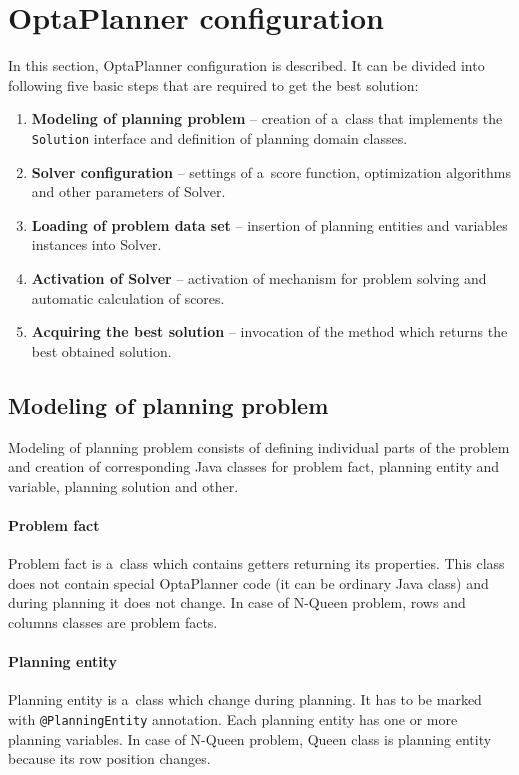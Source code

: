 \section{OptaPlanner configuration}\label{PlannerConfSection}
In this section, OptaPlanner configuration is described. It can be divided into following five basic steps that are
required to get the best solution:

\begin{enumerate}
    \item \textbf{Modeling of planning problem} -- creation of a~class that implements the \texttt{Solution} interface
    and definition of planning domain classes.
    \item \textbf{Solver configuration} -- settings of a~score function, optimization algorithms and other parameters of
    Solver.
    \item \textbf{Loading of problem data set} -- insertion of planning entities and variables instances into Solver.
    \item \textbf{Activation of Solver} -- activation of mechanism for problem solving and automatic calculation of
    scores.
    \item \textbf{Acquiring the best solution} -- invocation of the method which returns the best obtained solution.
\end{enumerate}

\subsection{Modeling of planning problem}
Modeling of planning problem consists of defining individual parts of the problem and creation of corresponding Java
classes for problem fact, planning entity and variable, planning solution and other.

\paragraph{Problem fact}
Problem fact is a~class which contains getters returning its properties. This class does not contain special OptaPlanner
code (it can be ordinary Java class) and during planning it does not change. In case of N-Queen problem, rows and
columns classes are problem facts.

\paragraph{Planning entity}
Planning entity is a~class which change during planning. It has to be marked with \texttt{@PlanningEntity} annotation.
Each planning entity has one or more planning variables. In case of N-Queen problem, Queen class is planning entity
because its row position changes.

